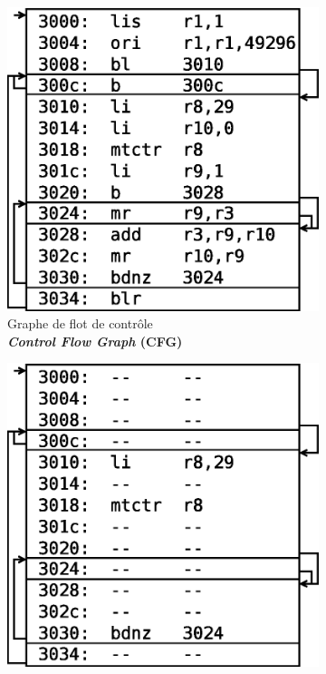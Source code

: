\documentclass[final]{beamer}
\begin{document}
\begin{frame}
\begin{columns}[t]
\begin{column}{.594\linewidth}
\begin{figure}[ht]
\begin{subfigure}{.30\textwidth}
            \includegraphics{img/recons-new.eps}
            \captionsetup{justification=centering}
            \caption{Graphe de flot de contrôle \\
              \textbf{\emph{Control Flow Graph} (CFG)}}
            \label{fig:recons}
          \end{subfigure}
          \hspace{1em}
          \begin{subfigure}{.30\textwidth}
            \centering
            \includegraphics{img/slice-new2.eps}

\end{subfigure}
\end{figure}
\end{column}
\end{columns}
\end{frame}
\end{document}
